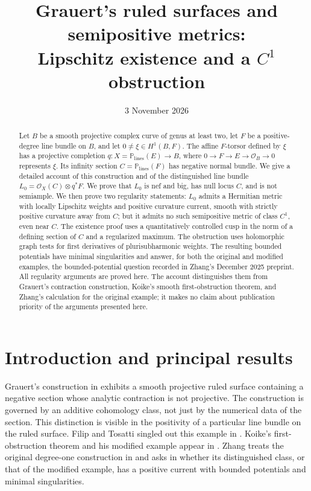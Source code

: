 \documentclass[11pt,a4paper]{article}
\title{Grauert's ruled surfaces and semipositive metrics:\\
 Lipschitz existence and a \texorpdfstring{$C^1$}{C1} obstruction}
\author{}
\date{3 November 2026}
\numberwithin{equation}{section}
\theoremstyle{definition}
\theoremstyle{remark}
\renewcommand{\P}{\mathbb P}
\newcommand{\OO}{\mathcal O}
\begin{document}
\maketitle
\begin{abstract}
Let $B$ be a smooth projective complex curve of genus at least two, let
$F$ be a positive-degree line bundle on $B$, and let $0\ne\xi\in H^1(B,F)$.
The affine $F$-torsor defined by $\xi$ has a projective completion
$q:X=\P_{\mathrm{lines}}(E)\to B$, where
$0\to F\to E\to\OO_B\to0$ represents $\xi$. Its infinity section
$C=\P_{\mathrm{lines}}(F)$ has negative normal bundle. We give a detailed
account of this construction and of the distinguished line bundle
$L_0=\OO_X(C)\otimes q^*F$. We prove that $L_0$ is nef and big, has null
locus $C$, and is not semiample. We then prove two regularity statements:
$L_0$ admits a Hermitian metric with locally Lipschitz weights and positive
curvature current, smooth with strictly positive curvature away from $C$;
but it admits no such semipositive metric of class $C^1$, even near $C$.
The existence proof uses a quantitatively controlled cusp in the norm of a
defining section of $C$ and a regularized maximum. The obstruction uses
holomorphic graph tests for first derivatives of plurisubharmonic weights.
The resulting bounded potentials have minimal singularities and answer,
for both the original and modified examples, the bounded-potential question
recorded in Zhang's December 2025 preprint. All regularity arguments are
proved here. The account distinguishes them from Grauert's contraction
construction, Koike's smooth first-obstruction theorem, and Zhang's
calculation for the original example; it makes no claim about publication
priority of the arguments presented here.
\end{abstract}
\tableofcontents

\section{Introduction and principal results}\label{sec:introduction}
Grauert's construction in \cite[\S4,8(d), pp.~365--366]{Grauert1962}
exhibits a smooth projective ruled surface containing a negative section
whose analytic contraction is not projective. The construction is governed
by an additive cohomology class, not just by the numerical data of the
section. This distinction is visible in the positivity of a particular
line bundle on the ruled surface. Filip and Tosatti singled out this
example in \cite[Problem~2.2, p.~2989]{FilipTosatti2018}. Koike's
first-obstruction theorem and his modified example appear in
\cite[Theorem~1.4 and Example~4.1]{Koike2021}. Zhang treats the original
degree-one construction in \cite[Theorem~3.2]{Zhang2025} and asks in
\cite[\S4]{Zhang2025} whether its distinguished class, or that of the
modified example, has a positive current with bounded potentials and
minimal singularities.
\end{document}
